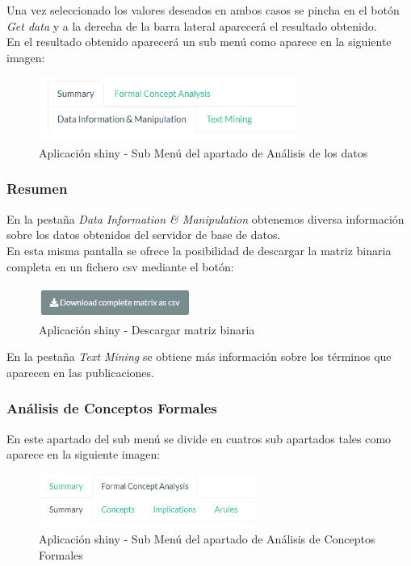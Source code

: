 \documentclass[../../main.tex]{subfiles}
\begin{document}
Una vez seleccionado los valores deseados en ambos casos se pincha en el botón \textit{Get data} y a la derecha de la barra lateral aparecerá el resultado obtenido.  \\

En el resultado obtenido aparecerá un sub menú como aparece en la siguiente imagen:

\begin{figure}[H]
\centering
\includegraphics[height=60pt]{images/apendices/db-menu.png}
\caption{Aplicación \Gls{shiny} - Sub Menú del apartado de Análisis de los datos}
\end{figure}

\subsubsection{Resumen}

En la pestaña \textit{Data Information \& Manipulation} obtenemos diversa información sobre los datos obtenidos del servidor de base de datos.  \\

En esta misma pantalla se ofrece la posibilidad de descargar la matriz binaria completa en un fichero \gls{csv} mediante el botón:

\begin{figure}[H]
\centering
\includegraphics[height=30pt]{images/apendices/db-data-dwnld.png}
\caption{Aplicación \Gls{shiny} - Descargar matriz binaria}
\end{figure}

En la pestaña \textit{Text Mining} se obtiene más información sobre los términos que aparecen en las publicaciones.

\subsubsection{Análisis de Conceptos Formales}

En este apartado del sub menú se divide en cuatros sub apartados tales como aparece en la siguiente imagen:

\begin{figure}[H]
\centering
\includegraphics[height=50pt]{images/apendices/db-fca-menu.png}
\caption{Aplicación \Gls{shiny} - Sub Menú del apartado de Análisis de Conceptos Formales}
\end{figure}
\end{document}
